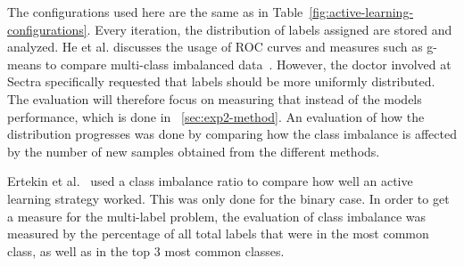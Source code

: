 The configurations used here are the same as in Table~\ref{fig:active-learning-configurations}.
Every iteration, the distribution of labels assigned are stored and analyzed.
He et al\@. discusses the usage of ROC curves and measures such as g-means to compare multi-class imbalanced data~\cite{he2009learning}.
However, the doctor involved at Sectra specifically requested that labels should be more uniformly distributed. 
The evaluation will therefore focus on measuring that instead of the models performance, which is done in ~\ref{sec:exp2-method}.
An evaluation of how the distribution progresses was done by comparing how the class imbalance is affected by the number of new samples obtained from the different methods.

Ertekin et al\@.~\cite{ertekin2007learning} used a class imbalance ratio to compare how well an active learning strategy worked.
This was only done for the binary case.
In order to get a measure for the multi-label problem, the evaluation of class imbalance was measured by the percentage of all total labels that were in the most common class, as well as in the top 3 most common classes.
